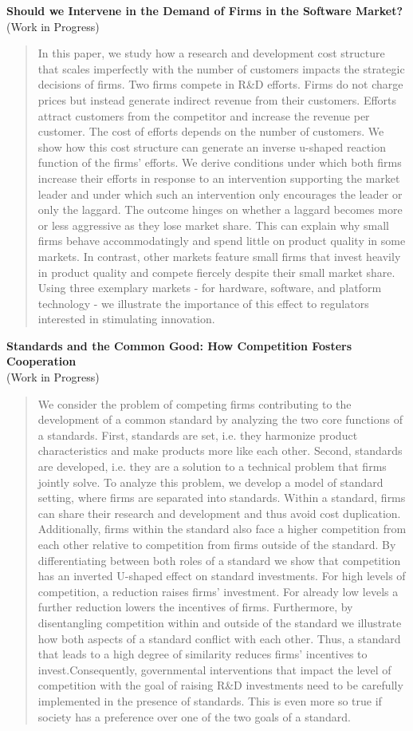 \documentclass[a4paper,10pt]{article} %
\begin{document}
	\textbf{Should we Intervene in the Demand of Firms in the Software Market?}\\
	(Work in Progress)
	\begin{quotation}
		In this paper, we study how a research and development cost structure that scales imperfectly with the number of customers impacts the strategic decisions of firms. Two firms compete in R\&D efforts. Firms do not charge prices but instead generate indirect revenue from their customers. Efforts attract customers from the competitor and increase the revenue per customer. The cost of efforts depends on the number of customers. We show how this cost structure can generate an inverse u-shaped reaction function of the firms' efforts. We derive conditions under which both firms increase their efforts in response to an intervention supporting the market leader and under which such an intervention only encourages the leader or only the laggard. The outcome hinges on whether a laggard becomes more or less aggressive as they lose market share. This can explain why small firms behave accommodatingly and spend little on product quality in some markets. In contrast, other markets feature small firms that invest heavily in product quality and compete fiercely despite their small market share.    Using three exemplary markets - for hardware, software, and platform technology - we illustrate the importance of this effect to regulators interested in stimulating innovation.
	\end{quotation}

	\textbf{Standards and the Common Good: How Competition Fosters Cooperation}\\
	(Work in Progress)
	\begin{quotation}
		We consider the problem of competing firms contributing to the development of a common standard by analyzing the two core functions of a standards. First, standards are set, i.e. they harmonize product characteristics and make products more like each other. Second, standards are developed, i.e. they are a solution to a technical problem that firms jointly solve. To analyze this problem, we develop a model of standard setting, where firms are separated into standards. Within a standard, firms can share their research and development and thus avoid cost duplication. Additionally, firms within the standard also face a higher competition from each other relative to competition from firms outside of the standard. By differentiating between both roles of a standard we show that competition has an inverted U-shaped effect on standard investments. For high levels of competition, a reduction raises firms’ investment. For already low levels a further reduction lowers the incentives of firms. Furthermore, by disentangling competition within and outside of the standard we illustrate how both aspects of a standard conflict with each other. Thus, a standard that leads to a high degree of similarity reduces firms’ incentives to invest.Consequently, governmental interventions that impact the level of competition with the goal of raising R\&D investments need to be carefully implemented in the presence of standards. This is even more so true if society has a preference over one of the two goals of a standard.
	\end{quotation}
		
\end{document}
